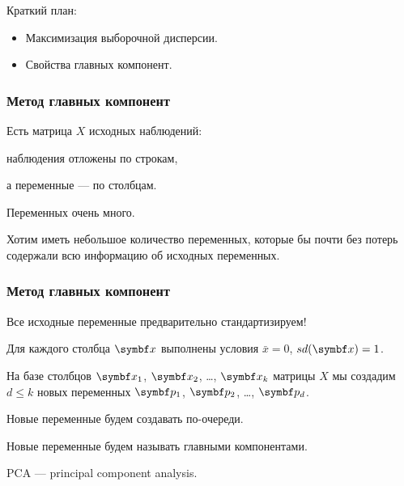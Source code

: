 
\begin{frame} %


\end{frame}



\begin{frame}{Краткий план:}
  \begin{itemize}[<+->]
    \item Максимизация выборочной дисперсии.
  \item Свойства главных компонент.
    \end{itemize}

\end{frame}




\begin{frame}
  \frametitle{Метод главных компонент}


  Есть матрица $X$ исходных наблюдений:

  наблюдения отложены по строкам, 
  
  а переменные — по столбцам. \pause


  Переменных очень много. \pause



  Хотим иметь небольшое количество переменных, 
  которые бы почти без потерь 
  содержали всю информацию об исходных переменных. 


\end{frame}


\begin{frame}
  \frametitle{Метод главных компонент}

  Все исходные переменные предварительно стандартизируем! \pause

  Для каждого столбца $\bx$ выполнены условия $\bar x =0$, $sd(\bx)=1$. \pause


  На базе столбцов $\bx_1$, $\bx_2$, \ldots, $\bx_k$ матрицы $X$ мы создадим 
  $d\leq k$ новых переменных $\bp_1$, $\bp_2$, \ldots, $\bp_d$. \pause

  Новые переменные будем создавать по-очереди. \pause

  Новые переменные будем называть \alert{главными компонентами}.

  PCA — principal component analysis.

\end{frame}


